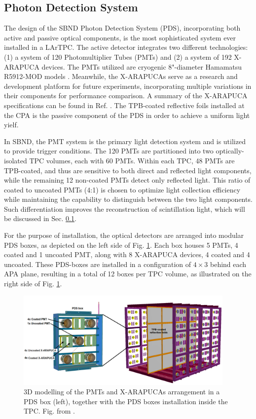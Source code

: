 \subsection{Photon Detection System}

The design of the SBND Photon Detection System (PDS), incorporating both active and passive optical components, is the most sophisticated system ever installed in a LArTPC. 
The active detector integrates two different technologies: (1) a system of 120 Photomultiplier Tubes (PMTs) and (2) a system of 192 X-ARAPUCA devices.
The PMTs utilized are cryogenic 8"-diameter Hamamatsu R5912-MOD models \cite{hamamatsu}. 
Meanwhile, the X-ARAPUCAs serve as a research and development platform for future experiments, incorporating multiple variations in their components for performance comparison. 
A summary of the X-ARAPUCA specifications can be found in Ref. \cite{}.
The TPB-coated reflective foils installed at the CPA is the passive component of the PDS in order to achieve a uniform light yielf.

In SBND, the PMT system is the primary light detection system and is utilized to provide trigger conditions. 
The 120 PMTs are partitioned into two optically-isolated TPC volumes, each with 60 PMTs.
Within each TPC, 48 PMTs are TPB-coated, and thus are sensitive to both direct and reflected light components, while the remaining 12 non-coated PMTs detect only reflected light. 
This ratio of coated to uncoated PMTs (4:1) is chosen to optimize light collection efficiency while maintaining the capability to distinguish between the two light components. 
Such differentiation improves the reconstruction of scintillation light, which will be discussed in Sec. \ref{}.

For the purpose of installation, the optical detectors are arranged into modular PDS boxes, as depicted on the left side of Fig. \ref{fig:SBND_PDS}. 
Each box houses 5 PMTs, 4 coated and 1 uncoated PMT, along with 8 X-ARAPUCA devices, 4 coated and 4 uncoated.
These PDS-boxes are installed in a configuration of $4 \times 3$ behind each APA plane, resulting in a total of 12 boxes per TPC volume, as illustrated on the right side of Fig. \ref{fig:SBND_PDS}.

\begin{figure}[hbp]
\centering    
\includegraphics[width=0.95\textwidth]{SBND_PDS}
\caption[SBND_PDS]{
3D modelling of the PMTs and X-ARAPUCAs arrangement in a PDS box (left), together with the PDS boxes installation inside the TPC.
Fig. from \cite{}.
}
\label{fig:SBND_PDS}
\end{figure}

